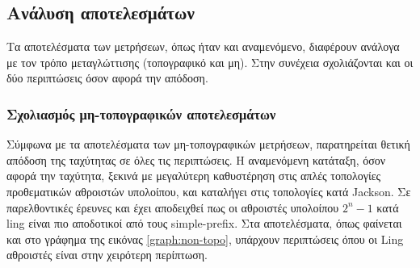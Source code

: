 


   













\clearpage
\subsection{Ανάλυση αποτελεσμάτων}
Τα αποτελέσματα των μετρήσεων, όπως ήταν και αναμενόμενο, διαφέρουν ανάλογα με τον τρόπο μεταγλώττισης (τοπογραφικό και μη). Στην συνέχεια σχολιάζονται και οι δύο περιπτώσεις όσον αφορά την απόδοση. 

\subsubsection{Σχολιασμός μη-τοπογραφικών αποτελεσμάτων}
Σύμφωνα με τα αποτελέσματα των μη-τοπογραφικών μετρήσεων, παρατηρείται θετική απόδοση της ταχύτητας σε όλες τις περιπτώσεις. Η αναμενόμενη κατάταξη, όσον αφορά την ταχύτητα, ξεκινά με μεγαλύτερη καθυστέρηση στις απλές τοπολογίες προθεματικών αθροιστών υπολοίπου, και καταλήγει στις τοπολογίες κατά Jackson. Σε παρελθοντικές έρευνες \cite{1377160} και \cite{4633502} έχει αποδειχθεί πως οι αθροιστές υπολοίπου $2^n-1$ κατά ling είναι πιο αποδοτικοί από τους simple-prefix. Στα αποτελέσματα, όπως φαίνεται και στο γράφημα της εικόνας \ref{graph:non-topo}, υπάρχουν περιπτώσεις όπου οι Ling αθροιστές είναι στην χειρότερη περίπτωση.

